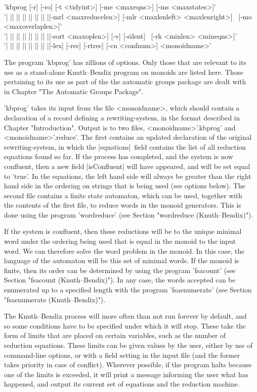 
'kbprog  [-r] [-ro] [-t <tidyint>] [-me <maxeqns>] [-ms <maxstates>]'\\
'| || || || || || || |[-mrl <maxreducelen>] [-mlr <maxlenleft> <maxlenright>] \
[-mo <maxoverlaplen>]'\\
'| || || || || || || |[-sort <maxoplen>] [-v] [-silent] \
[-rk <minlen> <mineqns>]'\\
'| || || || || || || |[-lex] [-rec] [-rtrec] [-cn <confnum>] <monoidname>'

The program 'kbprog' has zillions of options. Only those that are relevant
to its use as a stand-alone Knuth--Bendix program on monoids are listed here.
Those pertaining to its use as part of the the automatic groups package are
dealt with in Chapter "The Automatic Groups Package".

'kbprog' takes its input from the file <monoidname>, which should contain a
declaration of a record defining a rewriting-system, in the format described
in Chapter "Introduction". Output is to two files, <monoidname>'.kbprog' and
<monoidname>'.reduce'. The first contains an updated declaration of the
original rewriting-system, in which the |equations|\ field contains the
list of all reduction equations found so far. If the process has completed,
and the system is now confluent, then a new field |isConfluent| will
have appeared, and will be set equal to 'true'. In the equations,
the left hand side will always be greater than the right hand side in the
ordering on strings that is being used (see options below).
The second file contains a finite state automaton,
which can be used, together with the contents of the first file,
to reduce words in the monoid generators. This is done using the
program 'wordreduce' (see Section "wordreduce (Knuth--Bendix)").

If the system is confluent, then these reductions will be to the unique
minimal word under the ordering being used that is equal in the monoid to the
input word. We can therefore solve the word problem in the monoid. In this
case, the language of the automaton will be this set of minimal words.
If the monoid is finite, then its order can be determined by using the
program 'fsacount' (see Section "fsacount (Knuth--Bendix)").
In any case, the words accepted
can be enumerated up to a specified length with the program 'fsaenumerate'
(see Section "fsaenumerate (Knuth--Bendix)").

The Knuth--Bendix process will more often than not run forever by default,
and so some conditions have to be specified under which it will stop.
These take the form of limits that are placed on certain variables,
such as the number of reduction equations. 
These limits can be given values by the user, either by use of command-line
options, or with a field setting in the input file
(and the former takes priority in case of conflict).
Wherever possible, if the program halts because one of the limits is exceeded,
it will print a message informing the user what has happened,
and output its current set of equations and the reduction machine.

